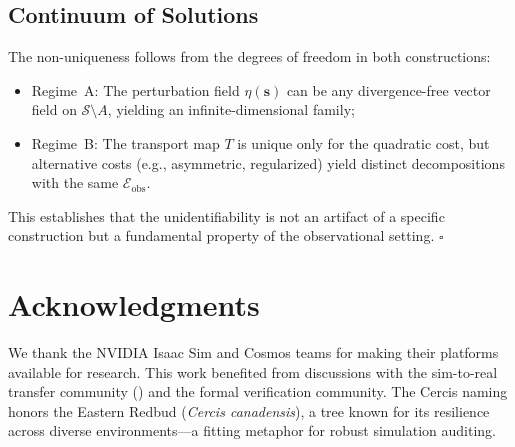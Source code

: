\documentclass[11pt,twocolumn]{article}
\theoremstyle{definition}
\newcommand{\cS}{\mathcal{S}}
\begin{document}
\subsection{Continuum of Solutions}

The non-uniqueness follows from the degrees of freedom in both constructions:
\begin{itemize}[nosep]
  \item Regime~A: The perturbation field $\eta(\mathbf{s})$ can be any
    divergence-free vector field on $\cS \setminus A$, yielding an
    infinite-dimensional family;
  \item Regime~B: The transport map $T$ is unique only for the quadratic cost,
    but alternative costs (e.g., asymmetric, regularized) yield distinct
    decompositions with the same $\mathcal{E}_{\text{obs}}$.
\end{itemize}

This establishes that the unidentifiability is not an artifact of a specific
construction but a fundamental property of the observational setting.
$\square$


\section*{Acknowledgments}
We thank the NVIDIA Isaac Sim and Cosmos teams for making their platforms
available for research.  This work benefited from discussions with the
sim-to-real transfer community (\textbf{}) and the formal
verification community.  The Cercis naming honors the Eastern Redbud
(\emph{Cercis canadensis}), a tree known for its resilience across diverse
environments---a fitting metaphor for robust simulation auditing.

\end{document}
